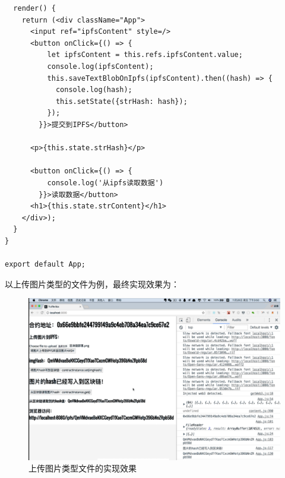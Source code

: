 \documentclass[a4paper,12pt,titlepage]{ctexart}
\begin{document}
\begin{enumerate}
\begin{footnotesize}
\begin{verbatim}
  render() {
    return (<div className="App">
      <input ref="ipfsContent" style=/>
      <button onClick={() => {
          let ipfsContent = this.refs.ipfsContent.value;
          console.log(ipfsContent);
          this.saveTextBlobOnIpfs(ipfsContent).then((hash) => {
            console.log(hash);
            this.setState({strHash: hash});
          });
        }}>提交到IPFS</button>

      <p>{this.state.strHash}</p>

      <button onClick={() => {
          console.log('从ipfs读取数据')
        }}>读取数据</button>
      <h1>{this.state.strContent}</h1>
    </div>);
  }
}

export default App;
	\end{verbatim}
\end{footnotesize}
\end{enumerate}

以上传图片类型的文件为例，最终实现效果为：
\begin{figure}[!hbp]
	\centering
	\includegraphics[scale=0.36]{fig24.png}
	\caption{上传图片类型文件的实现效果}
\end{figure}

\newpage
\end{document}
